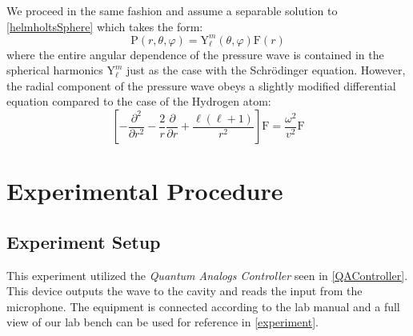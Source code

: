 \documentclass[12pt]{article}
\newcommand{\ppd}[1]{\frac{\partial}{\partial#1}}
\newcommand{\ppsd}[1]{\frac{\partial^2}{\partial #1^2}}
\begin{document}
We proceed in the same fashion and assume a separable solution to \eqref{helmholtsSphere} which takes the form:
\begin{equation}
	\mathrm{P}(r,\theta,\varphi) = \mathrm{Y}_\ell^m(\theta,\varphi) \mathrm{F}(r)
\end{equation}
where the entire angular dependence of the pressure wave is contained in the spherical harmonics $\mathrm{Y}_\ell^m$ just as the case with the Schr\"odinger equation. However, the radial component of the pressure wave obeys a slightly modified differential equation compared to the case of the Hydrogen atom:
\begin{equation}
	\left[ -\ppsd{r} - \frac{2}{r}\ppd{r} + \frac{\ell(\ell+1)}{r^2} \right] \mathrm{F} = \frac{\omega^2}{v^2}\mathrm{F}
\end{equation}


	
\section{Experimental Procedure}

	\subsection{Experiment Setup}

	This experiment utilized the \emph{Quantum Analogs Controller} seen in \cref{QAController}. This device outputs the wave to the cavity and reads the input from the microphone. The equipment is connected according to the lab manual \cite{labManual} and a full view of our lab bench can be used for reference in \cref{experiment}.
	
\end{document}
